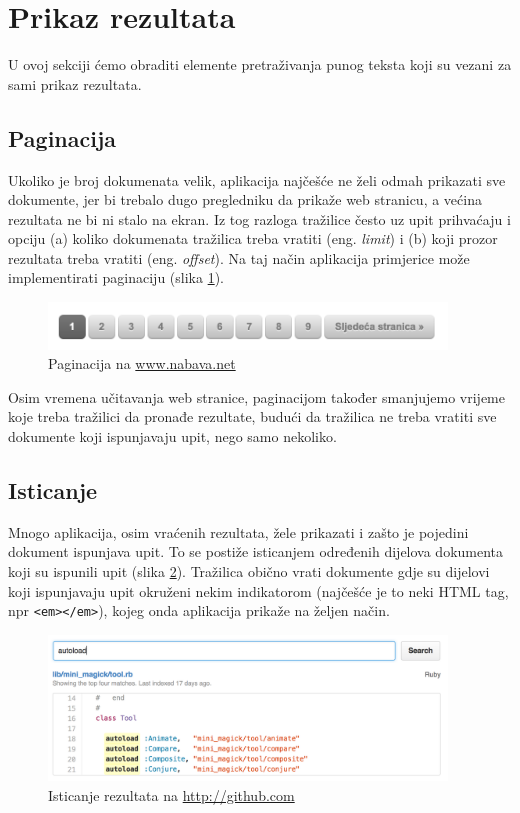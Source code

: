 \documentclass[a4paper,twoside,12pt]{scrreprt}
\begin{document}
\section{Prikaz rezultata}

U ovoj sekciji ćemo obraditi elemente pretraživanja punog teksta koji su vezani za sami prikaz rezultata.

\subsection{Paginacija}

Ukoliko je broj dokumenata velik, aplikacija najčešće ne želi odmah prikazati sve dokumente, jer bi trebalo dugo pregledniku da prikaže web stranicu, a većina rezultata ne bi ni stalo na ekran. Iz tog razloga tražilice često uz upit prihvaćaju i opciju (a) koliko dokumenata tražilica treba vratiti (eng. \textit{limit}) i (b) koji prozor rezultata treba vratiti (eng. \textit{offset}). Na taj način aplikacija primjerice može implementirati paginaciju (slika \ref{pagination}).

\begin{figure}[H]
  \centering
  \includegraphics[width=300pt]{pagination}
  \caption{Paginacija na \url{www.nabava.net}}
  \label{pagination}
\end{figure}

Osim vremena učitavanja web stranice, paginacijom također smanjujemo vrijeme koje treba tražilici da pronađe rezultate, budući da tražilica ne treba vratiti sve dokumente koji ispunjavaju upit, nego samo nekoliko.

\subsection{Isticanje}

Mnogo aplikacija, osim vraćenih rezultata, žele prikazati i zašto je pojedini dokument ispunjava upit. To se postiže isticanjem određenih dijelova dokumenta koji su ispunili upit (slika \ref{highlighting}). Tražilica obično vrati dokumente gdje su dijelovi koji ispunjavaju upit okruženi nekim indikatorom (najčešće je to neki HTML tag, npr \texttt{<em></em>}), kojeg onda aplikacija prikaže na željen način.

\begin{figure}[H]
  \centering
  \includegraphics[width=300pt]{highlighting}
  \caption{Isticanje rezultata na \url{http://github.com}}
  \label{highlighting}
\end{figure}
\end{document}
